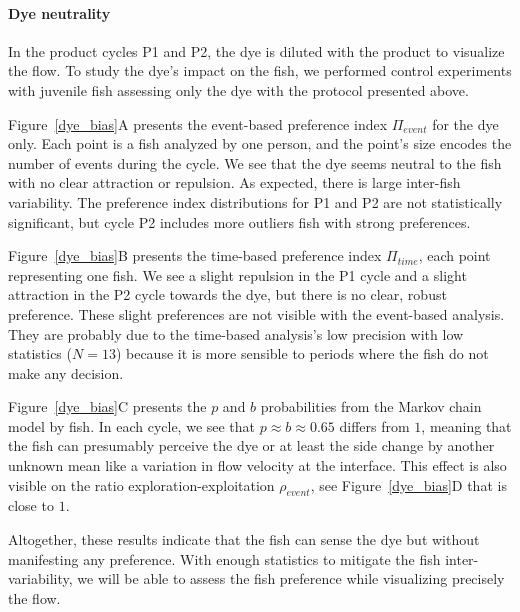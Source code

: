   \paragraph{Dye neutrality} In the product cycles P1 and P2, the dye is diluted with the product to visualize the flow. To study the dye's impact on the fish, we performed control experiments with juvenile fish assessing only the dye with the protocol presented above.

  Figure~\ref{dye_bias}A presents the event-based preference index $\Pi_{event}$ for the dye only. Each point is a fish analyzed by one person, and the point's size encodes the number of events during the cycle. We see that the dye seems neutral to the fish with no clear attraction or repulsion. As expected, there is large inter-fish variability. The preference index distributions for P1 and P2 are not statistically significant, but cycle P2 includes more outliers fish with strong preferences.

  Figure~\ref{dye_bias}B presents the time-based preference index $\Pi_{time}$, each point representing one fish. We see a slight repulsion in the P1 cycle and a slight attraction in the P2 cycle towards the dye, but there is no clear, robust preference. These slight preferences are not visible with the event-based analysis. They are probably due to the time-based analysis's low precision with low statistics ($N=13$) because it is more sensible to periods where the fish do not make any decision.

  Figure~\ref{dye_bias}C presents the $p$ and $b$ probabilities from the Markov chain model by fish. In each cycle, we see that $p \approx b \approx 0.65$ differs from $1$, meaning that the fish can presumably perceive the dye or at least the side change by another unknown mean like a variation in flow velocity at the interface. This effect is also visible on the ratio exploration-exploitation $\rho_{event}$, see Figure~\ref{dye_bias}D that is close to $1$.

  Altogether, these results indicate that the fish can sense the dye but without manifesting any preference. With enough statistics to mitigate the fish inter-variability, we will be able to assess the fish preference while visualizing precisely the flow.

